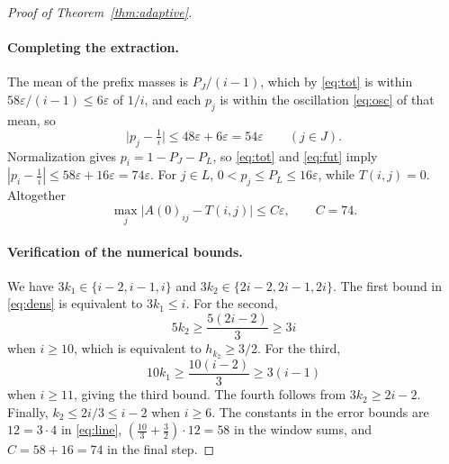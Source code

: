 \documentclass[10pt]{article} %
\theoremstyle{definition}
\begin{document}
\begin{proof}[Proof of Theorem~\ref{thm:adaptive}]
\paragraph{Completing the extraction.}
The mean of the prefix masses is \(P_J/(i-1)\), which by \eqref{eq:tot}
is within \(58\varepsilon/(i-1)\le6\varepsilon\) of \(1/i\), and each
\(p_j\) is within the oscillation \eqref{eq:osc} of that mean, so
\[
 \bigl|p_j-\tfrac1i\bigr|\le48\varepsilon+6\varepsilon=54\varepsilon
 \qquad(j\in J).
\]
Normalization gives \(p_i=1-P_J-P_L\), so \eqref{eq:tot} and
\eqref{eq:fut} imply
\(|p_i-\frac1i|\le58\varepsilon+16\varepsilon=74\varepsilon\).  For
\(j\in L\), \(0<p_j\le P_L\le16\varepsilon\), while \(T(i,j)=0\).
Altogether
\[
 \max_j\bigl|A(0)_{ij}-T(i,j)\bigr|\le C\varepsilon,
 \qquad C=74 .
\]

\paragraph{Verification of the numerical bounds.}
We have \(3k_1\in\{i-2,i-1,i\}\) and
\(3k_2\in\{2i-2,2i-1,2i\}\).  The first bound in \eqref{eq:dens} is
equivalent to \(3k_1\le i\).  For the second,
\[
 5k_2\ge\frac{5(2i-2)}3\ge3i
\]
when \(i\ge10\), which is equivalent to \(h_{k_2}\ge3/2\).  For the third,
\[
 10k_1\ge\frac{10(i-2)}3\ge3(i-1)
\]
when \(i\ge11\), giving the third bound.  The fourth follows from
\(3k_2\ge2i-2\).
Finally, \(k_2\le2i/3\le i-2\) when \(i\ge6\).  The constants in the
error bounds are \(12=3\cdot4\) in \eqref{eq:line},
\((\tfrac{10}3+\tfrac32)\cdot12=58\) in the window sums, and
\(C=58+16=74\) in the final step.
\end{proof}
\end{document}
